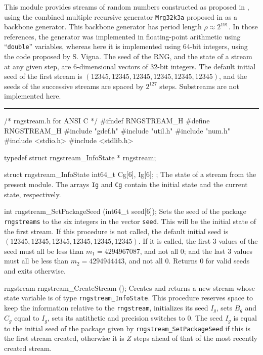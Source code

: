 
This module provides streams of random numbers constructed as proposed in \cite{rLEC02a},
using the combined multiple recursive generator {\tt Mrg32k3a} proposed in \cite{rLEC99b}
as a backbone generator.  This backbone generator has period length $\rho\approx 2^{191}$.
In those references, the generator was implemented in floating-point arithmetic
using ``\texttt{double}'' variables, whereas here it is implemented using 64-bit integers,
using the code proposed by S. Vigna.
The seed of the RNG, and the state of a stream at any given step,
are 6-dimensional vectors of 32-bit integers.
The default initial seed of the first stream is
$(12345, 12345, 12345, 12345, 12345, 12345)$,
and the seeds of the successive streams are spaced by $2^{127}$ steps.
Substreams are not implemented here.


\bigskip\hrule

\code\hide
/* rngstream.h for ANSI C */
#ifndef RNGSTREAM_H
#define RNGSTREAM_H
\endhide
#include "gdef.h"
#include "util.h"
#include "num.h"
#include <stdio.h>
#include <stdlib.h>

typedef struct rngstream_InfoState * rngstream;

struct rngstream_InfoState {
   int64_t Cg[6], Ig[6];
};
\endcode
 \tab
   The state of a stream from the present module.
   The arrays {\tt Ig} and {\tt Cg} contain the initial state
   and the current state, respectively.
 \endtab
\code

int rngstream_SetPackageSeed (int64_t seed[6]);
\endcode
  \tab  Sets the seed of the package {\tt rngstreams} to the
   six integers in the vector {\tt seed}.
   This will be the initial state of the first stream.
   If this procedure is not called, the default initial seed
   is $(12345, 12345, 12345, 12345, 12345, 12345)$.
   If it is called, the first 3 values of the seed must all be
   less than $m_1 = 4294967087$, and not all 0;
   and the last 3 values
   must all be less than $m_2 = 4294944443$, and not all 0.
   Returns 0 for valid seeds and exits otherwise.
 \endtab
\code

rngstream rngstream_CreateStream ();
\endcode
 \tab Creates and returns a new stream
   whose state variable is of type {\tt rngstream\_InfoState}.
   This procedure reserves space to keep the information relative to
   the {\tt rngstream}, initializes its seed $I_g$,
   sets $B_g$ and $C_g$ equal to $I_g$, sets its antithetic and precision
   switches to 0.
   The seed $I_g$ is equal to the initial seed of the package given by
   {\tt rngstream\_SetPackageSeed} if this is the first stream created,
   otherwise it is $Z$ steps ahead of that of the most recently
   created stream.
 \endtab
\code

